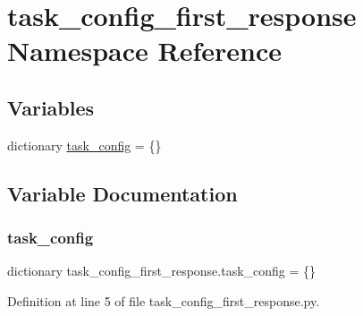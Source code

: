 \hypertarget{namespacetask__config__first__response}{}\section{task\+\_\+config\+\_\+first\+\_\+response Namespace Reference}
\label{namespacetask__config__first__response}
\subsection*{Variables}
\begin{DoxyCompactItemize}
\item 
dictionary \hyperlink{namespacetask__config__first__response_ac86c4d75bda7db74d847fee802fbd136}{task\+\_\+config} = \{\}
\end{DoxyCompactItemize}


\subsection{Variable Documentation}
\mbox{\label{namespacetask__config__first__response_ac86c4d75bda7db74d847fee802fbd136}} 
\subsubsection{\texorpdfstring{task\+\_\+config}{task\_config}}
{\footnotesize\ttfamily dictionary task\+\_\+config\+\_\+first\+\_\+response.\+task\+\_\+config = \{\}}



Definition at line 5 of file task\+\_\+config\+\_\+first\+\_\+response.\+py.

